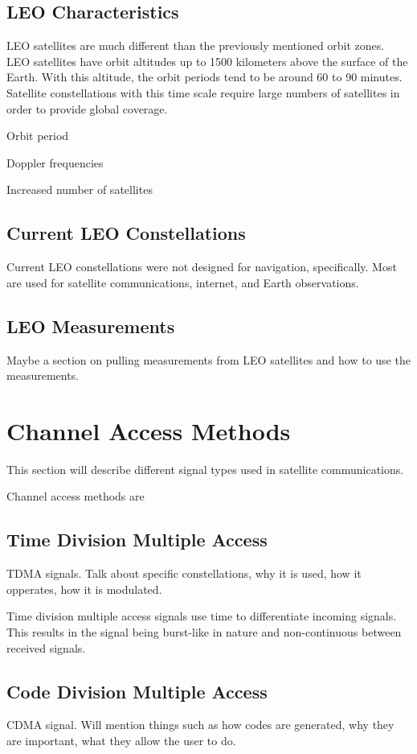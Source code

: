 \documentclass[12pt]{report}
\begin{document}
\subsection{LEO Characteristics}

LEO satellites are much different than the previously mentioned orbit zones. LEO satellites have orbit altitudes up to 1500 kilometers above the surface of the Earth. With this altitude, the orbit periods tend to be around 60 to 90 minutes. Satellite constellations with this time scale require large numbers of satellites in order to provide global coverage.

Orbit period

Doppler frequencies

Increased number of satellites

\subsection{Current LEO Constellations}
Current LEO constellations were not designed for navigation, specifically. Most are used for satellite communications, internet, and Earth observations. 

\subsection{LEO Measurements}
Maybe a section on pulling measurements from LEO satellites and how to use the measurements. 

\section{Channel Access Methods}
This section will describe different signal types used in satellite communications.

Channel access methods are 
\subsection{Time Division Multiple Access}
TDMA signals. Talk about specific constellations, why it is used, how it opperates, how it is modulated. 

Time division multiple access signals use time to differentiate incoming signals. This results in the signal being burst-like in nature and non-continuous between received signals. 

\subsection{Code Division Multiple Access}
CDMA signal. Will mention things such as how codes are generated, why they are important, what they allow the user to do.
\end{document}
